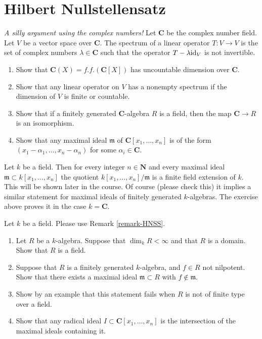 \section{Hilbert Nullstellensatz}
\label{section-Hilbert-Nullstellensatz}


\begin{exercise}
{\it A silly argument using the complex numbers!}
Let ${\mathbf C}$ be the complex number field. Let $V$ be a vector 
space over ${\mathbf C}$. The spectrum of a linear operator
$T : V \to V$ is the set of complex numbers $\lambda \in {\mathbf C}$
such that the operator $T - \lambda {\rm id}_V$ is not invertible.
\begin{enumerate}
\item Show that ${\mathbf C}(X)=f.f.({\mathbf C}[X])$
has uncountable dimension over ${\mathbf C}$.
\item Show that any linear operator on $V$ has a
nonempty spectrum if the dimension of $V$ is finite or
countable.
\item Show that if a finitely generated ${\mathbf C}$-algebra
$R$ is a field, then the map ${\mathbf C}\to R$ is an isomorphism.
\item Show that any maximal ideal ${\mathfrak m}$ of
${\mathbf C}[x_1,\ldots,x_n]$ is of the form
$(x_1-\alpha_1,\ldots,x_n-\alpha_n)$ for some $\alpha_i \in {\mathbf C}$.
\end{enumerate}
\end{exercise}

\begin{remark}
\label{remark-HNSS}
Let $k$ be a field. Then for every integer $n\in {\mathbf N}$ and
every maximal ideal ${\mathfrak m} \subset k[x_1,\ldots,x_n]$
the quotient $k[x_1,\ldots,x_n]/{\mathfrak m}$ is a finite field
extension of $k$. This will be shown later in the course. Of course
(please check this) it implies a similar statement for maximal ideals
of finitely generated $k$-algebras. The exercise above proves
it in the case $k={\mathbf C}$.
\end{remark}

\begin{exercise}
Let $k$ be a field. Please use Remark \ref{remark-HNSS}. 
\begin{enumerate}
\item Let $R$ be a $k$-algebra. Suppose that $\dim_k R < \infty$
and that $R$ is a domain. Show that $R$ is a field.
\item Suppose that $R$ is a finitely generated $k$-algebra, and
$f\in R$ not nilpotent. Show that there exists a maximal ideal
${\mathfrak m} \subset R$ with $f\not\in {\mathfrak m}$.
\item Show by an example that this statement fails when $R$
is not of finite type over a field. 
\item Show that any radical ideal $I \subset {\mathbf C}[x_1,\ldots,x_n]$
is the intersection of the maximal ideals containing it.
\end{enumerate}
\end{exercise}


